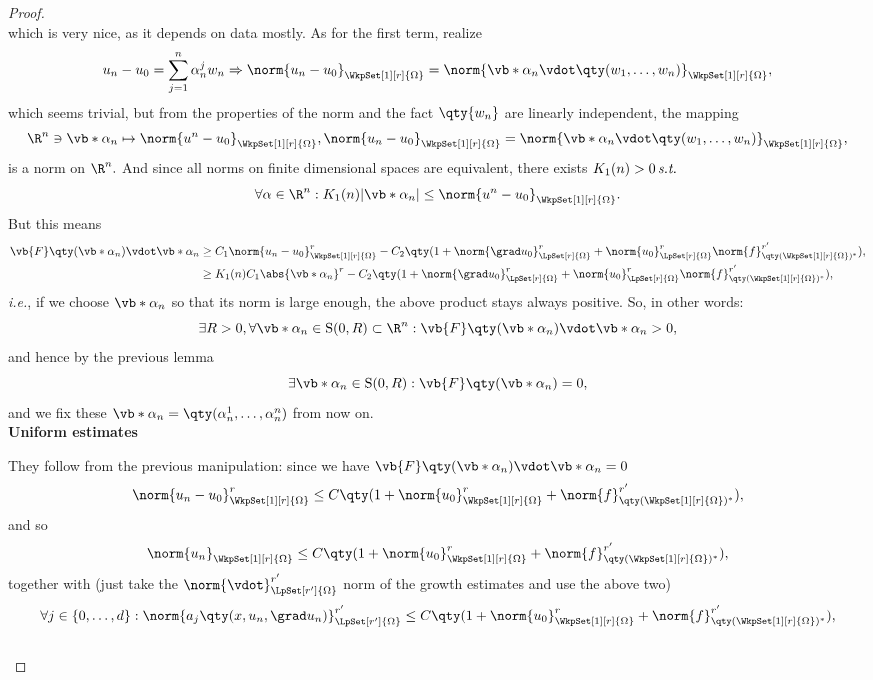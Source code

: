 \begin{proof}
\[\]
which is very nice, as it depends on data mostly. As for the first term, realize
	\[
		u_n - u_0 = \sum_{j=1}^n \alpha_n^j w_n \Rightarrow \norm{u_n - u_0}_{\WkpSet[1][r]{\Omega}} = \norm{\vb*{\alpha}_n \vdot \qty(w_1, \dots, w_n)}_{\WkpSet[1][r]{\Omega}},
	\]
	which seems trivial, but from the properties of the norm and the fact $\qty{w_n}$ are linearly independent, the mapping
	\[
		\R^{n} \ni \vb*{\alpha}_n  \mapsto \norm{u^n-u_0}_{\WkpSet[1][r]{\Omega}}, \norm{u_n - u_0}_{\WkpSet[1][r]{\Omega}} = \norm{\vb*{\alpha}_n \vdot \qty(w_1, \dots, w_n)}_{\WkpSet[1][r]{\Omega}},
	\]
	is a norm on $\R^{n}.$ And since all norms on finite dimensional spaces are equivalent, there exists $K_1(n) > 0 \, \text{\textit{s.t.}} \,$
	\[
		\forall \alpha \in \R^n: K_1(n) |\vb*{\alpha}_n| \leq \norm{u^n-u_0}_{\WkpSet[1][r]{\Omega}}.
	\]
	But this means
\begin{align*}
	\vb{F}\qty(\vb*{\alpha}_n) \vdot \vb*{\alpha}_n  &\geq C_1 \norm{u_n - u_0}_{\WkpSet[1][r]{\Omega}}^r - C_2\qty(1 + \norm{\grad u_0}_{\LpSet[r]{\Omega}}^r + \norm{u_0}_{\LpSet[r]{\Omega}}^r \norm{f}_{\qty(\WkpSet[1][r]{\Omega})^{*}}^{r'}),\\
							 &\geq K_1(n) C_1 \abs{\vb*{\alpha}_n}^r- C_2\qty(1 + \norm{\grad u_0}_{\LpSet[r]{\Omega}}^r + \norm{u_0}_{\LpSet[r]{\Omega}}^r \norm{f}_{\qty(\WkpSet[1][r]{\Omega})^{*}}^{r'}),
\end{align*}
\textit{i.e.}, if we choose $\vb*{\alpha}_n$ so that its norm is large enough, the above product stays always positive. So, in other words:
	\[
		\exists R>0, \forall \vb*{\alpha}_n \in \text{S}(0,R) \subset \R^n: \vb{F}\qty(\vb*{\alpha}_n) \vdot \vb*{\alpha}_n >0,
	\]
	and hence by the previous lemma
	\[
		\exists \vb*{\alpha}_n \in \text{S}(0,R): \vb{F}\qty(\vb*{\alpha}_n) = 0,
	\]
	and we fix these $\vb*{\alpha}_n = \qty(\alpha^1_n, \dots, \alpha_n^n)$ from now on. \\

	\textbf{Uniform estimates}


	They follow from the previous manipulation: since we have $\vb{F}\qty(\vb*{\alpha}_n) \vdot \vb*{\alpha}_n = 0$
	\[
		\norm{u_n-u_0}_{\WkpSet[1][r]{\Omega}}^r\leq C\qty(1+\norm{u_0}_{\WkpSet[1][r]{\Omega}}^r+ \norm{f}^{r'}_{\qty(\WkpSet[1][r]{\Omega})^{*}}),
	\]
	and so
	\[
		\norm{u_n}_{\WkpSet[1][r]{\Omega}} \leq C\qty(1+\norm{u_0}_{\WkpSet[1][r]{\Omega}}^r+ \norm{f}^{r'}_{\qty(\WkpSet[1][r]{\Omega})^{*}}),
	\]
	together with (just take the $\norm{\vdot}_{\LpSet[r']{\Omega}}^{r'}$ norm of the growth estimates and use the above two)
	\[
		\forall j \in \{0,\dots,d\}: \norm{a_j\qty(x, u_n, \grad u_n)}_{\LpSet[r']{\Omega}}^{r'} \leq C\qty(1+\norm{u_0}_{\WkpSet[1][r]{\Omega}}^r+ \norm{f}^{r'}_{\qty(\WkpSet[1][r]{\Omega})^{*}}),
	\] 
	\\


\end{proof}
